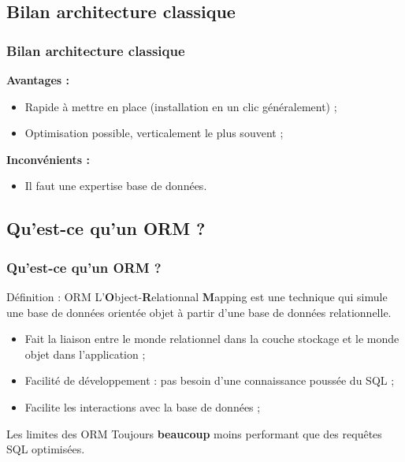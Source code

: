\documentclass[handout]{beamer}
\begin{document}
		\subsection{Bilan architecture classique}
		\begin{frame}
			\frametitle{Bilan architecture classique}

			\textbf{Avantages :}
			\begin{itemize}
				\item Rapide à mettre en place (installation en un clic généralement) ;
				\item Optimisation possible, verticalement le plus souvent ;
			\end{itemize}

			\vspace{20px}

			\textbf{Inconvénients :}
			\begin{itemize}
				\item Il faut une expertise base de données.
			\end{itemize}

		\end{frame}

		\subsection{Qu'est-ce qu'un ORM ?}
		\begin{frame}
			\frametitle{Qu'est-ce qu'un ORM ?}

			\begin{block}{Définition : ORM}
				L'\textbf{O}bject-\textbf{R}elationnal \textbf{M}apping est une technique qui simule une base de données orientée objet à partir d'une base de données relationnelle.
			\end{block}

			\vspace{5px}

			\begin{itemize}
				\item Fait la liaison entre le monde relationnel dans la couche stockage et le monde objet dans l'application ;
				\item Facilité de développement : pas besoin d'une connaissance poussée du SQL ;
				\item Facilite les interactions avec la base de données ;
			\end{itemize}

			\vspace{5px}

			\begin{alertblock}{Les limites des ORM}
				Toujours \textbf{beaucoup} moins performant que des requêtes SQL optimisées.
			\end{alertblock}

		\end{frame}
\end{document}
